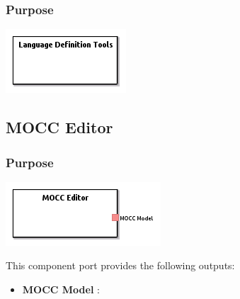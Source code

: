 \documentclass{gemoc} %
\begin{document}

\subsubsection{Purpose}


\begin{center}
\includegraphics*[trim=0.0cm 0.0cm 0cm 0.0cm, clip=true]{../images/generated/Generated_Language_Definition_Tools.png}
\end{center}




\subsection{MOCC Editor}


\subsubsection{Purpose}


\begin{center}
\includegraphics*[trim=0.0cm 0.0cm 0cm 0.0cm, clip=true]{../images/generated/Generated_MOCC_Editor.png}
\end{center}


This component port provides the following outputs:
\begin{itemize}
  \item \textbf{MOCC Model} :
\end{itemize}


\end{document}
